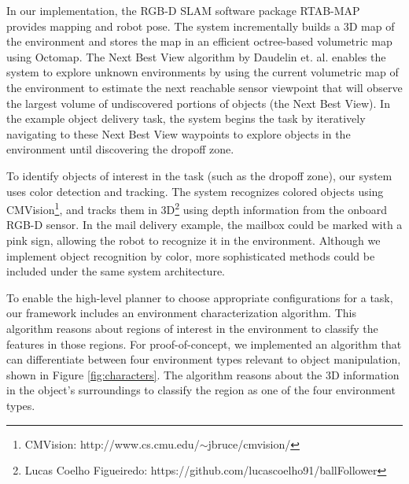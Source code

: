 \documentclass[12pt]{article}
\begin{document}
In our implementation, the RGB-D SLAM software package RTAB-MAP\cite{rtabmap} provides mapping and robot pose. The system incrementally builds a 3D map of the environment and stores the map in an efficient octree-based volumetric map using Octomap\cite{octomap}. The Next Best View algorithm by Daudelin et. al.\cite{Daudelin2017} enables the system to explore unknown environments by using the current volumetric map of the environment to estimate the next reachable sensor viewpoint that will observe the largest volume of undiscovered portions of objects (the Next Best View). In the example object delivery task, the system begins the task by iteratively navigating to these Next Best View waypoints to explore objects in the environment until discovering the dropoff zone.

To identify objects of interest in the task (such as the dropoff zone), our system uses color detection and tracking.  The system recognizes colored objects using CMVision\footnote{CMVision: http://www.cs.cmu.edu/$\sim$jbruce/cmvision/}, and tracks them in 3D\footnote{Lucas Coelho Figueiredo: https://github.com/lucascoelho91/ballFollower} using depth information from the onboard RGB-D sensor. In the mail delivery example, the mailbox could be marked with a pink sign, allowing the robot to recognize it in the environment. Although we implement object recognition by color, more sophisticated methods could be included under the same system architecture.

To enable the high-level planner to choose appropriate configurations for a task, our framework includes an environment characterization algorithm. This algorithm reasons about regions of interest in the environment to classify the features in those regions. For proof-of-concept, we implemented an algorithm that can differentiate between four environment types relevant to object manipulation, shown in Figure \ref{fig:characters}. The algorithm reasons about the 3D information in the object's surroundings to classify the region as one of the four environment types.

\end{document}
